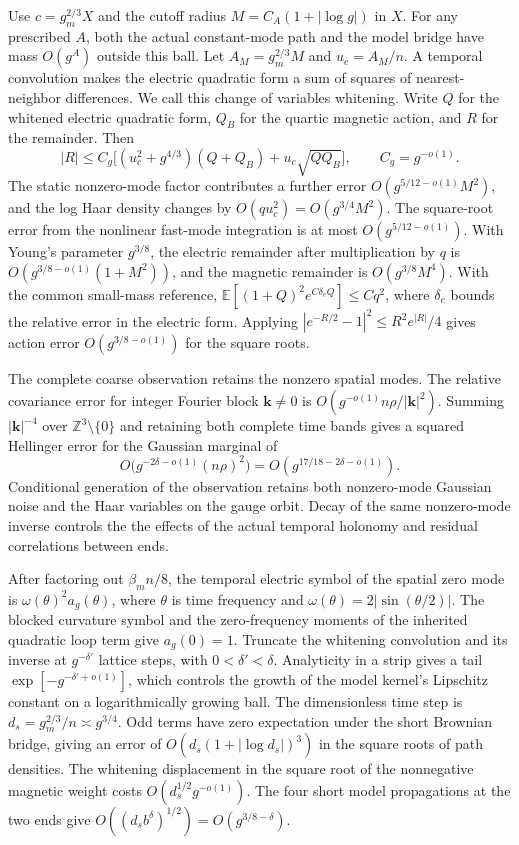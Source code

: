 \documentclass[11pt,a4paper]{article}
\numberwithin{equation}{section}
\begin{document}
Use \(c=g_m^{2/3}X\) and the cutoff radius \(M=C_A(1+|\log g|)\) in \(X\). For any prescribed \(A\), both the actual constant-mode path and the model bridge have mass \(O(g^A)\) outside this ball. Let \(A_M=g_m^{2/3}M\) and \(u_c=A_M/n\). A temporal convolution makes the electric quadratic form a sum of squares of nearest-neighbor differences. We call this change of variables whitening. Write \(Q\) for the whitened electric quadratic form, \(Q_B\) for the quartic magnetic action, and \(R\) for the remainder. Then
\begin{equation}
 |R|\le C_g\big[(u_c^2+g^{4/3})(Q+Q_B)+u_c\sqrt{QQ_B}\big],
      \qquad C_g=g^{-o(1)} .
 \label{eq:paper-action}
\end{equation}
The static nonzero-mode factor contributes a further error \(O(g^{5/12-o(1)}M^2)\), and the log Haar density changes by \(O(q u_c^2)=O(g^{3/4}M^2)\). The square-root error from the nonlinear fast-mode integration is at most \(O(g^{5/12-o(1)})\). With Young's parameter \(g^{3/8}\), the electric remainder after multiplication by \(q\) is \(O(g^{3/8-o(1)}(1+M^2))\), and the magnetic remainder is \(O(g^{3/8}M^4)\). With the common small-mass reference, \(\mathbb E[(1+Q)^2e^{C\delta_e Q}]\le Cq^2\), where \(\delta_e\) bounds the relative error in the electric form. Applying \(|e^{-R/2}-1|^2\le R^2e^{|R|}/4\) gives action error \(O(g^{3/8-o(1)})\) for the square roots.

The complete coarse observation retains the nonzero spatial modes. The relative covariance error for integer Fourier block \(\mathbf k\ne0\) is \(O(g^{-o(1)}n\rho/|\mathbf k|^2)\). Summing \(|\mathbf k|^{-4}\) over \(\mathbb Z^3\setminus\{0\}\) and retaining both complete time bands gives a squared Hellinger error for the Gaussian marginal of
\begin{equation}
 O\bigl(g^{-2\delta-o(1)}(n\rho)^2\bigr)
       =O(g^{17/18-2\delta-o(1)}).
 \label{eq:paper-normal}
\end{equation}
Conditional generation of the observation retains both nonzero-mode Gaussian noise and the Haar variables on the gauge orbit. Decay of the same nonzero-mode inverse controls the the effects of the actual temporal holonomy and residual correlations between ends.

After factoring out \(\beta_m n/8\), the temporal electric symbol of the spatial zero mode is \(\omega(\theta)^2 a_g(\theta)\), where \(\theta\) is time frequency and \(\omega(\theta)=2|\sin(\theta/2)|\). The blocked curvature symbol and the zero-frequency moments of the inherited quadratic loop term give \(a_g(0)=1\). Truncate the whitening convolution and its inverse at \(g^{-\delta'}\) lattice steps, with \(0<\delta'<\delta\). Analyticity in a strip gives a tail \(\exp[-g^{-\delta'+o(1)}]\), which controls the growth of the model kernel's Lipschitz constant on a logarithmically growing ball. The dimensionless time step is \(d_s=g_m^{2/3}/n\asymp g^{3/4}\). Odd terms have zero expectation under the short Brownian bridge, giving an error of \(O(d_s(1+|\log d_s|)^3)\) in the square roots of path densities. The whitening displacement in the square root of the nonnegative magnetic weight costs \(O(d_s^{1/2}g^{-o(1)})\). The four short model propagations at the two ends give \(O((d_s b^\delta)^{1/2})=O(g^{3/8-\delta})\).
\end{document}
